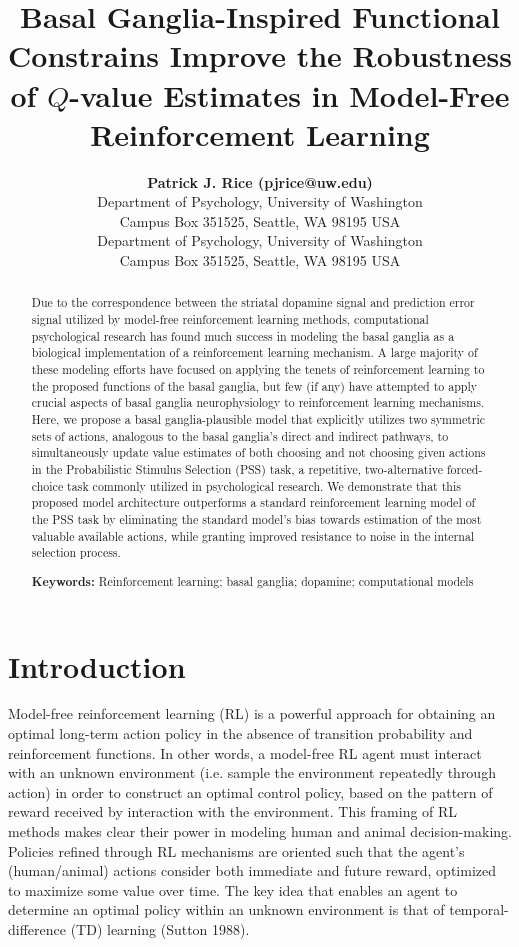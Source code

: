 \documentclass[10pt,letterpaper]{article}
\title{Basal Ganglia-Inspired Functional Constrains Improve the Robustness of $Q$-value Estimates in Model-Free Reinforcement Learning}
\author{{\large \bf Patrick J. Rice (pjrice@uw.edu)} \\
  Department of Psychology, University of Washington \\
  Campus Box 351525, Seattle, WA 98195 USA
  \AND {\large \bf Andrea Stocco (stocco@uw.edu)} \\
  Department of Psychology, University of Washington \\
  Campus Box 351525, Seattle, WA 98195 USA}
\begin{document}
\maketitle


\begin{abstract}
Due to the correspondence between the striatal dopamine signal and prediction error signal utilized by model-free reinforcement learning methods, computational psychological research has found much success in modeling the basal ganglia as a biological implementation of a reinforcement learning mechanism. A large majority of these modeling efforts have focused on applying the tenets of reinforcement learning to the proposed functions of the basal ganglia, but few (if any) have attempted to apply crucial aspects of basal ganglia neurophysiology to reinforcement learning mechanisms. Here, we propose a basal ganglia-plausible model that explicitly utilizes two symmetric sets of actions, analogous to the basal ganglia’s direct and indirect pathways, to simultaneously update value estimates of both choosing and not choosing given actions in the Probabilistic Stimulus Selection (PSS) task, a repetitive, two-alternative forced-choice task commonly utilized in psychological research. We demonstrate that this proposed model architecture outperforms a standard reinforcement learning model of the PSS task by eliminating the standard model’s bias towards estimation of the most valuable available actions, while granting improved resistance to noise in the internal selection process.

\textbf{Keywords:} 
Reinforcement learning; basal ganglia; dopamine; computational models
\end{abstract}


\section{Introduction}


Model-free reinforcement learning (RL) is a powerful approach for obtaining an optimal long-term action policy in the absence of transition probability and reinforcement functions. In other words, a model-free RL agent must interact with an unknown environment (i.e. sample the environment repeatedly through action) in order to construct an optimal control policy, based on the pattern of reward received by interaction with the environment. This framing of RL methods makes clear their power in modeling human and animal decision-making. Policies refined through RL mechanisms are oriented such that the agent’s (human/animal) actions consider both immediate and future reward, optimized to maximize some value over time. The key idea that enables an agent to determine an optimal policy within an unknown environment is that of temporal-difference (TD) learning (Sutton 1988). 
\end{document}
